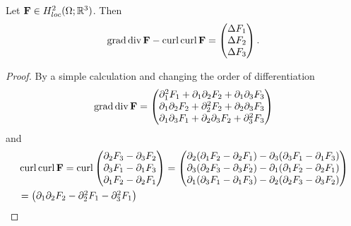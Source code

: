 \documentclass[../master_thesis.tex]{subfiles}
\begin{document}
\begin{lemma}\label{lem:graddiv_curlcurl_equals_componentwise_laplacian}
    Let $\mathbf{F} \in H^2_{loc}(\Omega;\mathbb{R}^3)$. Then 
    \begin{align*}
        \operatorname{grad} \operatorname{div} \mathbf{F} - \operatorname{curl} \operatorname{curl} \mathbf{F} 
        = \begin{pmatrix} \Delta F_1 \\ \Delta F_2 
            \\ \Delta F_3  \end{pmatrix}.
    \end{align*}
\end{lemma}
\begin{proof}
    By a simple calculation and changing the order of differentiation
    \begin{align*}
        \operatorname{grad} \operatorname{div} \mathbf{F} = 
            \begin{pmatrix} \partial_1^2 F_1 + \partial_1 \partial_2 F_2
                + \partial_1 \partial_3 F_3
            \\ \partial_1\partial_2 F_2 + \partial_2^2 F_2 + 
                \partial_2\partial_3 F_3
            \\ \partial_1 \partial_3 F_1 + \partial_2\partial_3 F_2
                + \partial_3^2 F_3
            \end{pmatrix}
    \end{align*}
    and 
    \begin{align*}
        &\operatorname{curl} \operatorname{curl} \mathbf{F} = \operatorname{curl} \begin{pmatrix} 
            \partial_2 F_3 - \partial_3 F_2 \\ \partial_3 F_1 - \partial_1 F_3 
            \\ \partial_1 F_2 - \partial_2 F_1  \end{pmatrix}
        = \begin{pmatrix} 
            \partial_2 (\partial_1 F_2 - \partial_2 F_1)
                - \partial_3 (\partial_3 F_1 - \partial_1 F_3)
            \\ \partial_3 (\partial_2 F_3 - \partial_3 F_2)
                - \partial_1 (\partial_1 F_2 - \partial_2 F_1)
            \\ \partial_1 (\partial_3 F_1 - \partial_1 F_3)
                - \partial_2 (\partial_2 F_3 - \partial_3 F_2)  
            \end{pmatrix}
        \\ &= \begin{pmatrix}
            \partial_1 \partial_2 F_2 - \partial^2_2 F_1 - \partial_3^2 F_1

\end{pmatrix}
\end{align*}
\end{proof}
\end{document}
